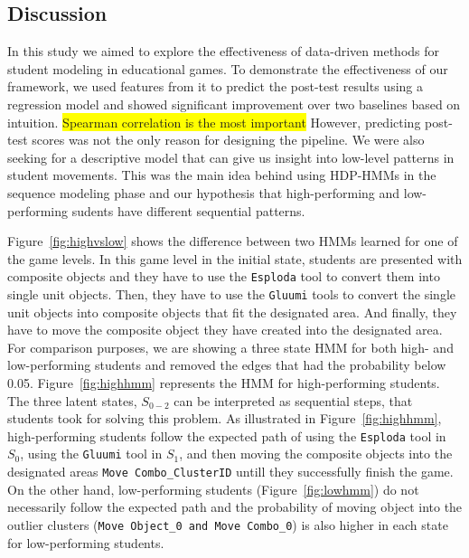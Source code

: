 \documentclass{sigchi}
\newcommand{\hl}[1]{\colorbox{yellow}{#1}}
\begin{document}
\subsection{Discussion}
In this study we aimed to explore the effectiveness of data-driven methods for student modeling in educational games. 
To demonstrate the effectiveness of our framework, we used features from it to predict the post-test results using a regression model and showed significant improvement over two  baselines based on intuition. 
\hl{Spearman correlation is the most important}
However, predicting post-test scores was not the only reason for designing the pipeline. 
We were also seeking for a descriptive model that can give us insight into low-level patterns in student movements. 
This was the main idea behind using HDP-HMMs in the sequence modeling phase and our hypothesis that high-performing and low-performing sudents have different sequential patterns. 

Figure~\ref{fig:highvslow} shows the difference between two HMMs learned for one of the game levels.
In this game level in the initial state, students are presented with composite objects and they have to use the \texttt{Esploda} tool to convert them into single unit objects. 
Then, they have to use the \texttt{Gluumi} tools to convert the single unit objects into composite objects that fit the designated area. 
And finally, they have to move the composite object they have created into the designated area.
For comparison purposes, we are showing a three state HMM for both high- and low-performing students and removed the edges that had the probability below 0.05. 
Figure~\ref{fig:highhmm} represents the HMM for high-performing students. The three latent states, $S_{0-2}$ can be interpreted as sequential steps, that students took for solving this problem. As illustrated in Figure~\ref{fig:highhmm}, high-performing students follow the expected path of using the \texttt{Esploda} tool in $S_0$, using the \texttt{Gluumi} tool in $S_1$, and then moving the composite objects into the designated areas \texttt{Move Combo\_{ClusterID}} untill they successfully finish the game.
On the other hand, low-performing students (Figure~\ref{fig:lowhmm}) do not necessarily follow the expected path and the probability of moving object into the outlier clusters (\texttt{Move Object\_0 and Move Combo\_0}) is also higher in each state for low-performing students.
\end{document}
